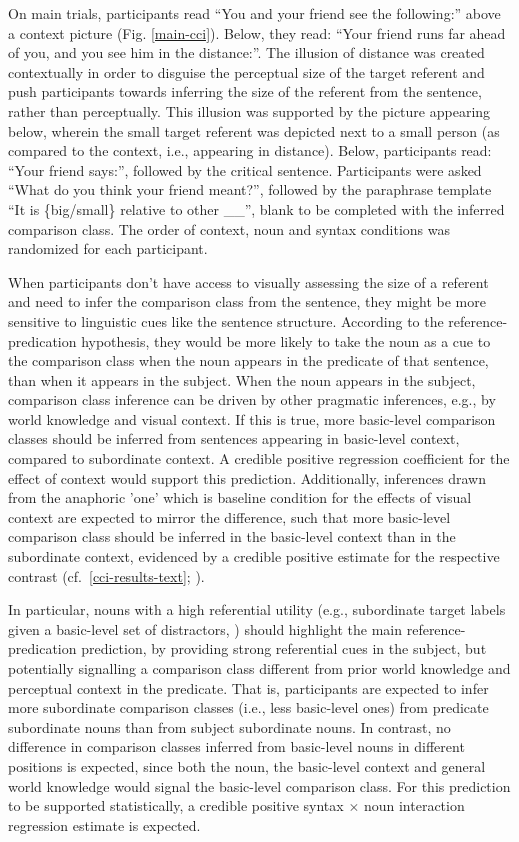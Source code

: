 On main trials, participants read “You and your friend see the following:” above a context picture  (Fig. \ref{main-cci}). Below, they read: “Your friend runs far ahead of you, and you see him in the distance:”. The illusion of distance was created contextually in order to disguise the perceptual size of the target referent and push participants towards inferring the size of the referent from the sentence, rather than perceptually. This illusion was supported by the picture appearing below, wherein the small target referent was depicted next to a small person (as compared to the context, i.e., appearing in distance). Below, participants read: “Your friend says:”, followed by the critical sentence. Participants were asked “What do you think your friend meant?”, followed by the paraphrase template “It is \{big/small\} relative to other \_\_”, blank to be completed with the inferred comparison class. The order of context, noun and syntax conditions was randomized for each participant.

When participants don’t have access to visually assessing the size of a referent and need to infer the comparison class from the sentence, they might be more sensitive to linguistic cues like the sentence structure. According to the reference-predication hypothesis, they would be more likely to take the noun as a cue to the comparison class when the noun appears in the predicate of that sentence, than when it appears in the subject. 
When the noun appears in the subject, comparison class inference can be driven by other pragmatic inferences, e.g., by world knowledge and visual context. If this is true, more basic-level comparison classes should be inferred from sentences appearing in basic-level context, compared to subordinate context. A credible positive regression coefficient for the effect of context would support this prediction. Additionally, inferences drawn from the anaphoric 'one' which is baseline condition for the effects of visual context are expected to mirror the difference, such that more basic-level comparison class should be inferred in the basic-level context than in the subordinate context, evidenced by a credible positive estimate for the respective contrast (cf.~\ref{cci-results-text}; \textcite[cf.]{goldberg2017one}).
 
In particular, nouns with a high referential utility (e.g., subordinate target labels given a basic-level set of distractors, \textcite[cf.][]{graf2016animal}) should highlight the main reference-predication prediction, by providing strong referential cues in the subject, but potentially signalling a comparison class different from prior world knowledge and perceptual context in the predicate. That is, participants are expected to infer more subordinate comparison classes (i.e., less basic-level ones) from predicate subordinate nouns than from subject subordinate nouns. In contrast, no difference in comparison classes inferred from basic-level nouns in different positions is expected, since both the noun, the basic-level context and general world knowledge would signal the basic-level comparison class. For this prediction to be supported statistically, a credible positive syntax $\times$ noun interaction regression estimate is expected.
 
